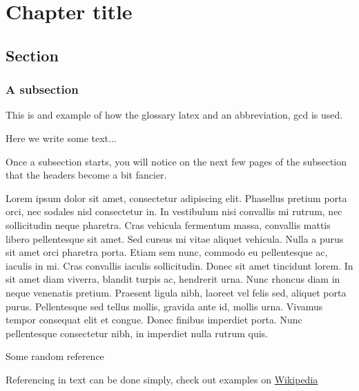 \newpage

\chapter{Chapter title}
\section{Section}
\subsection{A subsection}

This is and example of how the glossary \Gls{latex} and an abbreviation, \gls{gcd} is used.

Here we write some text...

Once a subsection starts, you will notice on the next few pages of the subsection that the headers become a bit fancier.

Lorem ipsum dolor sit amet, consectetur adipiscing elit. Phasellus pretium porta orci, nec sodales nisl consectetur in. In vestibulum nisi convallis mi rutrum, nec sollicitudin neque pharetra. Cras vehicula fermentum massa, convallis mattis libero pellentesque sit amet. Sed cursus mi vitae aliquet vehicula. Nulla a purus sit amet orci pharetra porta. Etiam sem nunc, commodo eu pellentesque ac, iaculis in mi. Cras convallis iaculis sollicitudin. Donec sit amet tincidunt lorem. In sit amet diam viverra, blandit turpis ac, hendrerit urna. Nunc rhoncus diam in neque venenatis pretium. Praesent ligula nibh, laoreet vel felis sed, aliquet porta purus. Pellentesque sed tellus mollis, gravida ante id, mollis urna. Vivamus tempor consequat elit et congue. Donec finibus imperdiet porta. Nunc pellentesque consectetur nibh, in imperdiet nulla rutrum quis.

Some random reference \cite{albertyUseLegendreTransforms2001}

Referencing in text can be done simply, check out examples on \href{https://en.wikibooks.org/wiki/LaTeX/Bibliography_Management}{{Wikipedia}} 

